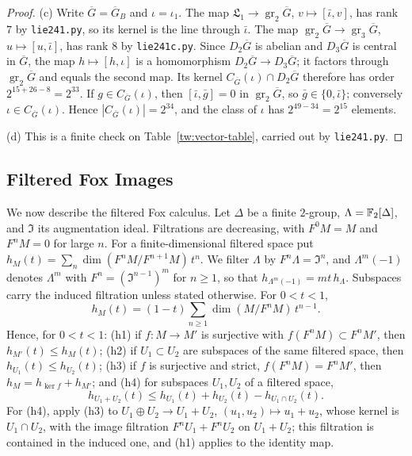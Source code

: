 \begin{proof}
(c) Write $\overline G=\overline G_B$ and $\iota=\iota_1$. The map
$\mathfrak L_1\to\operatorname{gr}_2\overline G$, $v\mapsto[\bar\iota,v]$, has
rank $7$ by \texttt{lie241.py}, so its kernel is the line through
$\bar\iota$. The map
$\operatorname{gr}_2\overline G\to\operatorname{gr}_3\overline G$,
$u\mapsto[u,\bar\iota]$, has rank $8$ by \texttt{lie241c.py}. Since
$D_2\overline G$ is abelian and $D_3\overline G$ is central in $\overline G$,
the map $h\mapsto[h,\iota]$ is a homomorphism $D_2\overline G\to D_3\overline G$;
it factors through $\operatorname{gr}_2\overline G$ and equals the second map.
Its kernel $C_{\overline G}(\iota)\cap D_2\overline G$ therefore has order
$2^{15+26-8}=2^{33}$. If $g\in C_{\overline G}(\iota)$, then
$[\bar\iota,\bar g]=0$ in $\operatorname{gr}_2\overline G$, so
$\bar g\in\{0,\bar\iota\}$; conversely $\iota\in C_{\overline G}(\iota)$.
Hence $|C_{\overline G}(\iota)|=2^{34}$, and the class of $\iota$ has
$2^{49-34}=2^{15}$ elements.

(d) This is a finite check on Table~\ref{tw:vector-table}, carried out by
\texttt{lie241.py}.
\end{proof}

\subsection{Filtered Fox Images}\label{tw:fox-section}
We now describe the filtered Fox calculus.
Let $\Delta$ be a finite $2$-group, $\Lambda=\mathbb F_2[\Delta]$, and
$\mathfrak I$ its augmentation ideal. Filtrations are decreasing, with
$F^0M=M$ and $F^nM=0$ for large $n$. For a finite-dimensional filtered space
put $h_M(t)=\sum_n\dim(F^nM/F^{n+1}M)\,t^n$. We filter $\Lambda$ by
$F^n\Lambda=\mathfrak I^n$, and $\Lambda^m(-1)$ denotes $\Lambda^m$ with
$F^n=(\mathfrak I^{n-1})^m$ for $n\ge1$, so that
$h_{\Lambda^m(-1)}=mt\,h_\Lambda$. Subspaces carry the induced filtration
unless stated otherwise. For $0<t<1$,
\begin{equation}\label{tw:cumulative}
 h_M(t)=(1-t)\sum_{n\ge1}\dim(M/F^nM)\,t^{n-1}.
\end{equation}
Hence, for $0<t<1$: (h1) if $f\colon M\to M'$ is surjective with
$f(F^nM)\subset F^nM'$, then $h_{M'}(t)\le h_M(t)$; (h2) if $U_1\subset U_2$
are subspaces of the same filtered space, then $h_{U_1}(t)\le h_{U_2}(t)$;
(h3) if $f$ is surjective and strict, $f(F^nM)=F^nM'$, then
$h_M=h_{\ker f}+h_{M'}$; and (h4) for subspaces $U_1,U_2$ of a filtered
space,
\begin{equation}\label{tw:filtered-sum}
 h_{U_1+U_2}(t)\le h_{U_1}(t)+h_{U_2}(t)-h_{U_1\cap U_2}(t).
\end{equation}
For (h4), apply (h3) to $U_1\oplus U_2\to U_1+U_2$, $(u_1,u_2)\mapsto u_1+u_2$,
whose kernel is $U_1\cap U_2$, with the image filtration $F^nU_1+F^nU_2$ on
$U_1+U_2$; this filtration is contained in the induced one, and (h1) applies
to the identity map.

